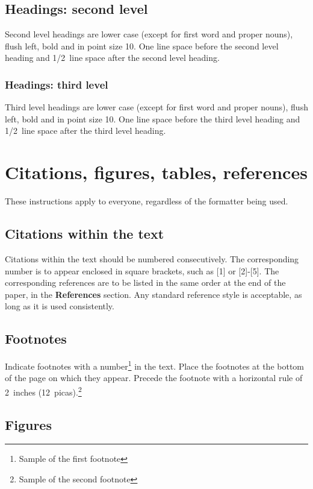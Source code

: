 \subsection{Headings: second level}

Second level headings are lower case (except for first word and proper 
nouns), flush left, bold and in point
size 10. One line space before the second level heading and
1/2~line space after the second level heading.

\subsubsection{Headings: third level}

Third level headings are lower case (except for first word and proper
nouns), flush left, bold and in point
size 10. One line space before the third level heading and
1/2~line space after the third level heading.

\section{Citations, figures, tables, references}
\label{others}
These instructions apply to everyone, regardless of the 
formatter being used. 

\subsection{Citations within the text}

Citations within the text should be numbered consecutively. 
The corresponding number is to appear enclosed in square 
brackets, such as [1] or [2]-[5]. The corresponding references 
are to be listed in the same order at the end of the paper, 
in the {\bf References} section. Any standard reference style 
is acceptable, as long as it is used consistently. 

\subsection{Footnotes}

Indicate footnotes with a number\footnote{Sample of the first
footnote} in the text. Place the footnotes at the bottom of the
page on which they appear. Precede the footnote with a horizontal
rule of 2~inches (12~picas).\footnote{Sample of the second
footnote} 

\subsection{Figures} 

